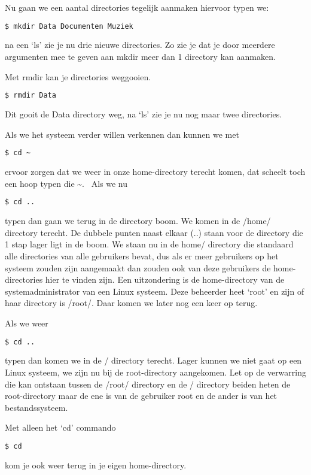 Nu gaan we een aantal directories tegelijk aanmaken hiervoor typen we:
\begin{lstlisting}[language=bash]
$ mkdir Data Documenten Muziek
\end{lstlisting}
na een `ls' zie je nu drie nieuwe directories. Zo zie je dat je door meerdere argumenten mee te geven aan mkdir meer dan 1 directory kan aanmaken.

Met rmdir kan je directories weggooien.
\begin{lstlisting}[language=bash]
$ rmdir Data
\end{lstlisting}
Dit gooit de Data directory weg, na `ls' zie je nu nog maar twee directories.

Als we het systeem verder willen verkennen dan kunnen we met
\begin{lstlisting}[language=bash]
$ cd ~
\end{lstlisting}
ervoor zorgen dat we weer in onze home-directory terecht komen, dat scheelt toch een hoop typen die \~{}. \ Als we nu
\begin{lstlisting}[language=bash]
$ cd ..
\end{lstlisting}
typen dan gaan we terug in de directory boom. We komen in de /home/ directory terecht. De dubbele punten naast elkaar (..) staan voor de directory die 1 stap lager ligt in de boom. We staan nu in de home/ directory die standaard alle directories van alle gebruikers bevat, dus als er meer gebruikers op het systeem zouden zijn aangemaakt dan zouden ook van deze gebruikers de home-directories hier te vinden zijn. Een uitzondering is de home-directory van de systemadministrator van een Linux systeem. Deze beheerder heet `root' en zijn of haar directory is /root/. Daar komen we later nog een keer op terug.

Als we weer
\begin{lstlisting}[language=bash]
$ cd ..
\end{lstlisting}
typen dan komen we in de / directory terecht. Lager kunnen we niet gaat op een Linux systeem, we zijn nu bij de root-directory aangekomen. Let op de verwarring die kan ontstaan tussen de /root/ directory en de / directory beiden heten de root-directory maar de ene is van de gebruiker root en de ander is van het bestandssysteem.

Met alleen het `cd' commando
\begin{lstlisting}[language=bash]
$ cd
\end{lstlisting}
kom je ook weer terug in je eigen home-directory.


